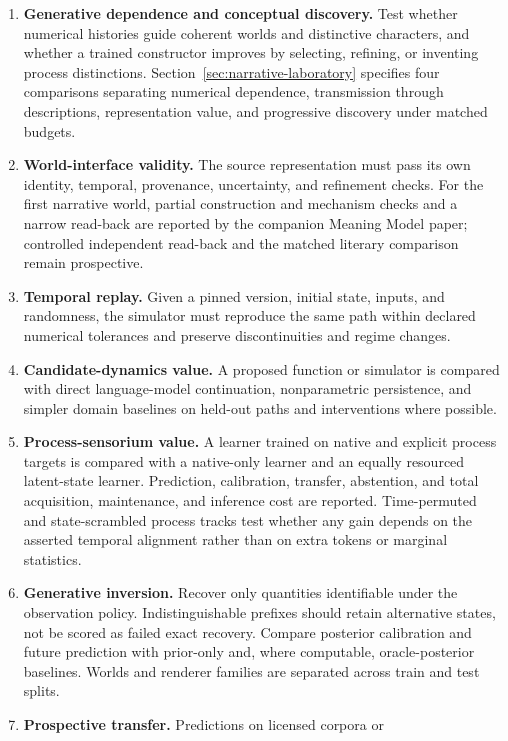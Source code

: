 \documentclass[10pt]{article}
\begin{document}
\begin{enumerate}
  \item \textbf{Generative dependence and conceptual discovery.} Test whether
    numerical histories guide coherent worlds and distinctive characters,
    and whether a trained constructor improves by selecting, refining, or
    inventing process distinctions. Section~\ref{sec:narrative-laboratory}
    specifies four comparisons separating numerical dependence, transmission
    through descriptions, representation value, and progressive discovery
    under matched budgets.
  \item \textbf{World-interface validity.} The source representation must pass
    its own identity, temporal, provenance, uncertainty, and refinement checks.
    For the first narrative world, partial construction and mechanism
    checks and a narrow read-back are reported by the companion Meaning Model
    paper; controlled independent read-back and the matched literary comparison
    remain prospective.
  \item \textbf{Temporal replay.} Given a pinned version, initial state, inputs,
    and randomness, the simulator must reproduce the same path within declared
    numerical tolerances and preserve discontinuities and regime changes.
  \item \textbf{Candidate-dynamics value.} A proposed function or simulator is
    compared with direct language-model continuation, nonparametric persistence,
    and simpler domain baselines on held-out paths and interventions where
    possible.
  \item \textbf{Process-sensorium value.} A learner trained on native and
    explicit process targets is compared with a native-only learner and an
    equally resourced latent-state learner. Prediction, calibration, transfer,
    abstention, and total acquisition, maintenance, and inference cost are
    reported. Time-permuted and state-scrambled process tracks test whether any
    gain depends on the asserted temporal alignment rather than on extra tokens
    or marginal statistics.
  \item \textbf{Generative inversion.} Recover only quantities identifiable
    under the observation policy. Indistinguishable prefixes should retain
    alternative states, not be scored as failed exact recovery. Compare
    posterior calibration and future prediction with prior-only and, where
    computable, oracle-posterior baselines. Worlds and renderer families are
    separated across train and test splits.
  \item \textbf{Prospective transfer.} Predictions on licensed corpora or

\end{enumerate}
\end{document}
